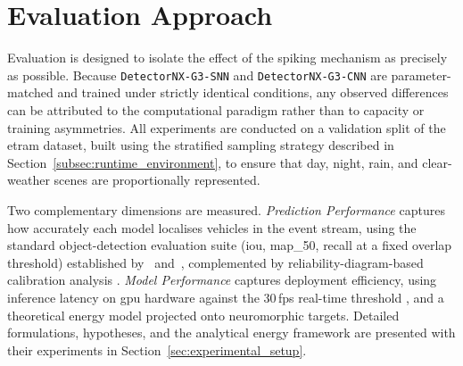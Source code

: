 \section{Evaluation Approach}
\label{sec:intro_evaluation_approach}

Evaluation is designed to isolate the effect of the spiking mechanism as
precisely as possible. Because \texttt{DetectorNX-G3-SNN} and
\texttt{DetectorNX-G3-CNN} are parameter-matched and trained under
strictly identical conditions, any observed differences can be attributed
to the computational paradigm rather than to capacity or training
asymmetries. All experiments are conducted on a validation split of the
\gls{etram} dataset, built using the stratified sampling strategy
described in Section~\ref{subsec:runtime_environment}, to ensure that
day, night, rain, and clear-weather scenes are proportionally
represented.

Two complementary dimensions are measured. \emph{Prediction Performance}
captures how accurately each model localises vehicles in the event
stream, using the standard object-detection evaluation suite (\gls{iou}, \gls{map_50}, recall at a fixed overlap threshold) established by~\textcite{lin2014microsoft} and~\textcite{everingham2010pascal},
complemented by reliability-diagram-based calibration analysis \cite{guo2017calibration}. \emph{Model Performance}
captures deployment efficiency, using inference latency on \gls{gpu}
hardware against the $30$\,\gls{fps} real-time threshold
\cite{khan2024real}, and a theoretical energy model projected onto
neuromorphic targets. Detailed formulations, hypotheses, and the
analytical energy framework are presented with their experiments in
Section~\ref{sec:experimental_setup}.
